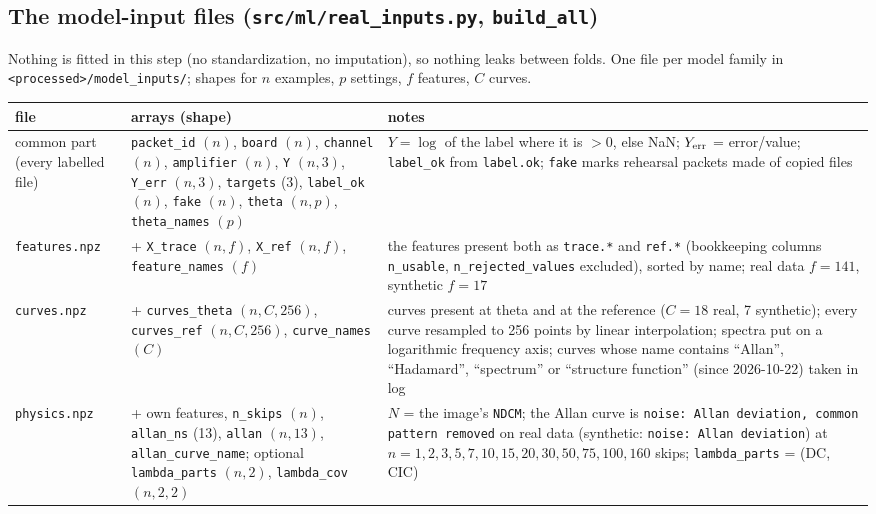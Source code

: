 \documentclass[10pt]{article}
\newcommand{\code}[1]{\texttt{#1}}
\begin{document}
\subsection{The model-input files (\code{src/ml/real\_inputs.py}, \code{build\_all})}

Nothing is fitted in this step (no standardization, no imputation), so nothing leaks between folds. One file per model
family in \code{<processed>/model\_inputs/}; shapes for $n$ examples, $p$ settings, $f$ features, $C$ curves.

\begin{table}[H]
\centering\small
\begin{tabularx}{\textwidth}{>{\raggedright\arraybackslash}p{2.4cm}>{\raggedright\arraybackslash}p{4.6cm}L}
\toprule
file & arrays (shape) & notes \\
\midrule
common part (every labelled file) & \code{packet\_id} $(n)$, \code{board} $(n)$, \code{channel} $(n)$, \code{amplifier} $(n)$,
\code{Y} $(n,3)$, \code{Y\_err} $(n,3)$, \code{targets} (3), \code{label\_ok} $(n)$, \code{fake} $(n)$, \code{theta} $(n,p)$,
\code{theta\_names} $(p)$ & $Y = \log$ of the label where it is $> 0$, else NaN; $Y_{\rm err}$ = error/value;
\code{label\_ok} from \code{label.ok}; \code{fake} marks rehearsal packets made of copied files \\
\code{features.npz} & + \code{X\_trace} $(n,f)$, \code{X\_ref} $(n,f)$, \code{feature\_names} $(f)$ & the features present
both as \code{trace.*} and \code{ref.*} (bookkeeping columns \code{n\_usable}, \code{n\_rejected\_values} excluded), sorted
by name; real data $f = 141$, synthetic $f = 17$ \\
\code{curves.npz} & + \code{curves\_theta} $(n,C,256)$, \code{curves\_ref} $(n,C,256)$, \code{curve\_names} $(C)$ & curves
present at theta and at the reference ($C = 18$ real, 7 synthetic); every curve resampled to 256 points by linear
interpolation; spectra put on a logarithmic frequency axis; curves whose name contains ``Allan'', ``Hadamard'', ``spectrum'' or ``structure function'' (since 2026-10-22) taken
in log \\
\code{physics.npz} & + own features, \code{n\_skips} $(n)$, \code{allan\_ns} (13), \code{allan} $(n,13)$,
\code{allan\_curve\_name}; optional \code{lambda\_parts} $(n,2)$, \code{lambda\_cov} $(n,2,2)$ & $N$ = the image's
\code{NDCM}; the Allan curve is \code{noise: Allan deviation, common pattern removed} on real data (synthetic:
\code{noise: Allan deviation}) at $n = 1,2,3,5,7,10,15,20,30,50,75,100,160$ skips; \code{lambda\_parts} = (DC, CIC) \\

\end{tabularx}
\end{table}
\end{document}

